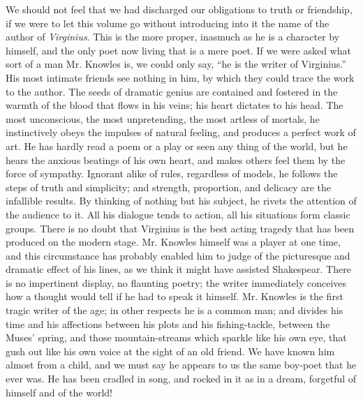 \bulletrule

We should not feel that we had discharged our obligations to truth
or friendship, if we were to let this volume go without
introducing into it the name of the author of
\emph{Virginius}. This is the more proper, inasmuch as he is a
character by himself, and the only poet now living that is a mere
poet. If we were asked what sort of a man Mr. Knowles is, we could
only say, ``he is the writer of Virginius.'' His most intimate
friends see nothing in him, by which they could trace the work to
the author. The seeds of dramatic genius are contained and
fostered in the warmth of the blood that flows in his veins; his
heart dictates to his head. The most unconscious, the most
unpretending, the most artless of mortals, he instinctively obeys
the impulses of natural feeling, and produces a perfect work of
art. He has hardly read a poem or a play or seen any thing of the
world, but he hears the anxious beatings of his own heart, and
makes others feel them by the force of sympathy. Ignorant alike of
rules, regardless of models, he follows the steps of truth and
simplicity; and strength, proportion, and delicacy are the
infallible results. By thinking of nothing but his subject, he
rivets the attention of the audience to it. All his dialogue tends
to action, all his situations form classic groups. There is no
doubt that Virginius is the best acting tragedy that has been
produced on the modern stage. Mr.  Knowles himself was a player at
one time, and this circumstance has probably enabled him to judge
of the picturesque and dramatic effect of his lines, as we think
it might have assisted Shakespear. There is no impertinent
display, no flaunting poetry; the writer immediately conceives how
a thought would tell if he had to speak it himself. Mr.  Knowles
is the first tragic writer of the age; in other respects he is a
common man; and divides his time and his affections between his
plots and his fishing-tackle, between the Muses' spring, and those
mountain-streams which sparkle like his own eye, that gush out
like his own voice at the sight of an old friend. We have known
him almost from a child, and we must say he appears to us the same
boy-poet that he ever was. He has been cradled in song, and rocked
in it as in a dream, forgetful of himself and of the world!

